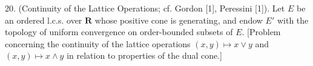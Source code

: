20. (Continuity of the Lattice Operations; cf. Gordon [1], Peressini [1]). Let $E$ be an ordered l.c.s. over $\mathbf{R}$ whose positive cone is generating, and endow $E'$ with the topology of uniform convergence on order-bounded subsets of $E$.
[Problem concerning the continuity of the lattice operations $(x,y) \mapsto x \vee y$ and $(x,y) \mapsto x \wedge y$ in relation to properties of the dual cone.]
